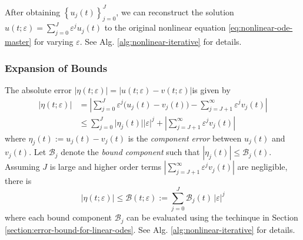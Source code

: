 \documentclass{uai2023}
\newcommand{\Err}{\eta}
\newcommand{\Bound}{\mathcal{B}}
\begin{document}
    After obtaining $\left\{u_j(t)\right\}_{j=0}^{J}$, we can reconstruct the solution $u(t;\varepsilon) = \sum_{j=0}^{J} \varepsilon^j u_j(t)$ to the original nonlinear equation \ref{eq:nonlinear-ode-master} for varying $\varepsilon$.
    See Alg. \ref{alg:nonlinear-iterative} for details.

\subsubsection{Expansion of Bounds}
    The absolute error $|\Err(t;\varepsilon)| = |u(t;\varepsilon) - v(t;\varepsilon)|$is given by 
    {
        \small
        \begin{align}
            |\Err(t; \varepsilon)| %
            &= \left|\sum_{j=0}^{J} \varepsilon^{j} \Big(u_j(t) - v_j(t)\Big) - \sum_{j=J+1}^{\infty} \varepsilon^j v_j(t)\right| \nonumber \\[-0.5em]
            &\leq \sum_{j=0}^{J} \Big|\Err_{j}(t)\Big||\varepsilon|^j + \left|\sum_{j=J+1}^{\infty}\varepsilon^j v_j(t)\right| 
        \end{align}
    }
    where $\Err_{j}(t) := u_j(t) - v_j(t)$ is the \textit{component error} between $u_j(t)$ and $v_j(t)$.
    Let $\Bound_{j}$ denote the \textit{bound component} such that $|\Err_{j}(t)| \leq \Bound_j(t)$.
    Assuming $J$ is large and higher order terms $\left|\sum_{j=J+1}^{\infty}\varepsilon^j v_j(t)\right|$ are negligible, there is 
    {
        \small
        \begin{equation} \label{eq:nonlinear-bound-components}
            \Big|\Err(t; \varepsilon)\Big| \leq \Bound(t; \varepsilon) := \sum_{j=0}^{J} \Bound_j(t)\,|\varepsilon|^j 
        \end{equation}
    }
    where each bound component $\Bound_j$ can be evaluated using the techinque in Section \ref{section:error-bound-for-linear-odes}. 
    See Alg. \ref{alg:nonlinear-iterative} for details.
\end{document}
